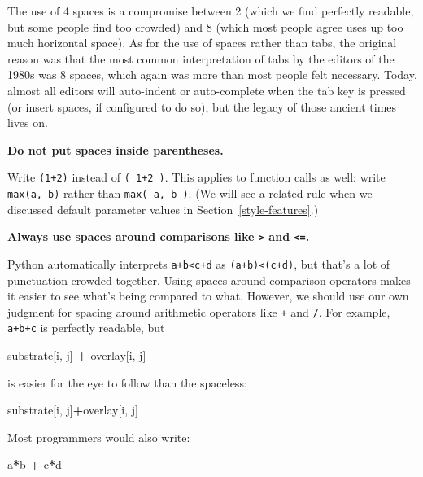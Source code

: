 \documentclass[
]{krantz}
\makeatletter
\newenvironment{Shaded}{\begin{snugshade}}{\end{snugshade}}
\newcommand{\NormalTok}[1]{#1}
\newcommand{\OperatorTok}[1]{\textcolor[rgb]{0.81,0.36,0.00}{\textbf{#1}}}
\newenvironment{kframe}{%
\medskip{}
\setlength{\fboxsep}{.8em}
 \def\at@end@of@kframe{}%
 \ifinner\ifhmode%
  \def\at@end@of@kframe{\end{minipage}}%
  \begin{minipage}{\columnwidth}%
 \fi\fi%
 \def\FrameCommand##1{\hskip\@totalleftmargin \hskip-\fboxsep
 \colorbox{shadecolor}{##1}\hskip-\fboxsep
     \hskip-\linewidth \hskip-\@totalleftmargin \hskip\columnwidth}%
 \MakeFramed {\advance\hsize-\width
   \@totalleftmargin\z@ \linewidth\hsize
   \@setminipage}}%
 {\par\unskip\endMakeFramed%
 \at@end@of@kframe}
\renewenvironment{Shaded}{\begin{kframe}}{\end{kframe}}
\makeatother
\begin{document}
The use of 4 spaces is a compromise between 2
(which we find perfectly readable, but some people find too crowded)
and 8
(which most people agree uses up too much horizontal space).
As for the use of spaces rather than tabs,
the original reason was that the most common interpretation of tabs
by the editors of the 1980s was 8 spaces,
which again was more than most people felt necessary.
Today,
almost all editors will auto-indent or auto-complete when the tab key is pressed
(or insert spaces, if configured to do so),
but the legacy of those ancient times lives on.

\textbf{Do not put spaces inside parentheses.}

Write \texttt{(1+2)} instead of \texttt{(~1+2~)}.
This applies to function calls as well:
write \texttt{max(a,\ b)} rather than \texttt{max(~a,~b~)}.
(We will see a related rule when we discussed default parameter values
in Section~\ref{style-features}.)

\textbf{Always use spaces around comparisons like \texttt{\textgreater{}} and \texttt{\textless{}=}.}

Python automatically interprets \texttt{a+b\textless{}c+d} as \texttt{(a+b)\textless{}(c+d)},
but that's a lot of punctuation crowded together.
Using spaces around comparison operators makes it easier to see
what's being compared to what.
However,
we should use our own judgment for spacing around arithmetic operators like \texttt{+} and \texttt{/}.
For example,
\texttt{a+b+c} is perfectly readable,
but

\begin{Shaded}
\begin{Highlighting}[]
\NormalTok{substrate[i, j] }\OperatorTok{+}\NormalTok{ overlay[i, j]}
\end{Highlighting}
\end{Shaded}

is easier for the eye to follow than the spaceless:

\begin{Shaded}
\begin{Highlighting}[]
\NormalTok{substrate[i, j]}\OperatorTok{+}\NormalTok{overlay[i, j]}
\end{Highlighting}
\end{Shaded}

Most programmers would also write:

\begin{Shaded}
\begin{Highlighting}[]
\NormalTok{a}\OperatorTok{*}\NormalTok{b }\OperatorTok{+}\NormalTok{ c}\OperatorTok{*}\NormalTok{d}
\end{Highlighting}
\end{Shaded}
\end{document}
